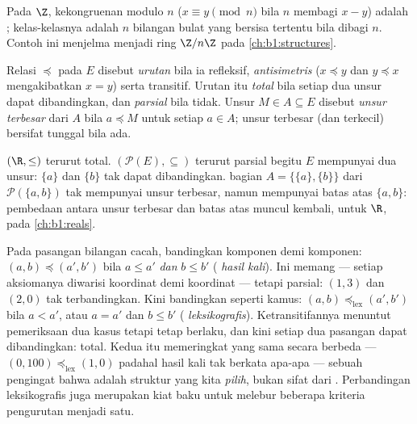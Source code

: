 \begin{example}\label{ex:b1:logic:congruence}
Pada $\Z$, kekongruenan modulo $n$ ($x \equiv y \pmod n$ bila $n$
membagi $x - y$) adalah ; kelas-kelasnya adalah $n$
 bilangan bulat yang bersisa tertentu bila dibagi $n$. Contoh
ini menjelma menjadi ring $\Z/n\Z$ pada \cref{ch:b1:structures}.
\end{example}

\begin{definition}\label{def:b1:logic:order}
Relasi $\preceq$ pada $E$ disebut \emph{urutan}
bila ia refleksif, \emph{antisimetris} ($x \preceq y$ dan $y
\preceq x$ mengakibatkan $x = y$) serta transitif. Urutan itu
\emph{total} bila setiap dua unsur dapat dibandingkan, dan
\emph{parsial} bila tidak. Unsur $M \in A \subseteq E$ disebut
\emph{unsur terbesar} dari $A$ bila $a \preceq M$ untuk setiap
$a \in A$; unsur terbesar (dan terkecil) bersifat tunggal bila ada.
\end{definition}

\begin{example}\label{ex:b1:logic:orders}
$(\R, \leq)$ terurut total. $(\mathcal{P}(E), \subseteq)$ terurut
parsial begitu $E$ mempunyai dua unsur: $\{a\}$ dan
$\{b\}$ tak dapat dibandingkan.  bagian $A = \{\{a\}, \{b\}\}$
dari $\mathcal{P}(\{a,b\})$ tak mempunyai unsur terbesar, namun
mempunyai batas atas $\{a, b\}$: pembedaan antara unsur terbesar dan
batas atas muncul kembali, untuk $\R$, pada \cref{ch:b1:reals}.
\end{example}

\begin{example}\label{ex:b1:logic:lexorder}
Pada pasangan bilangan cacah, bandingkan komponen demi komponen:
$(a, b) \preceq (a',
b')$ bila $a \leq a'$ \emph{dan} $b \leq b'$ (\emph{ hasil
kali}). Ini memang  --- setiap aksiomanya diwarisi koordinat
demi koordinat --- tetapi  parsial: $(1, 3)$ dan $(2, 0)$ tak
terbandingkan. Kini bandingkan seperti kamus: $(a, b)
\preceq_{\mathrm{lex}} (a', b')$ bila $a < a'$, atau $a = a'$ dan $b
\leq b'$ (\emph{ leksikografis}). Ketransitifannya menuntut
pemeriksaan dua kasus tetapi tetap berlaku, dan kini setiap dua
pasangan dapat dibandingkan:  total. Kedua  itu
memeringkat  yang sama secara berbeda
--- $(0, 100) \preceq_{\mathrm{lex}} (1, 0)$ padahal  hasil
kali tak berkata apa-apa --- sebuah pengingat bahwa  adalah
struktur yang kita \emph{pilih}, bukan sifat dari .
Perbandingan leksikografis juga merupakan kiat baku untuk melebur
beberapa kriteria pengurutan menjadi satu.
\end{example}

